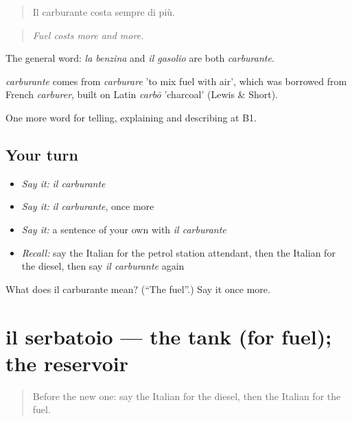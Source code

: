 \begin{quote}
Il carburante costa sempre di più.
\end{quote}

\begin{quote}
\emph{Fuel costs more and more.}
\end{quote}

The general word: \emph{la benzina} and \emph{il gasolio} are both \emph{carburante}.

\begin{cousinweb}
\emph{carburante} comes from \emph{carburare} 'to mix fuel with air', which was borrowed from French \emph{carburer}, built on Latin \emph{carbō} 'charcoal' (Lewis \& Short).
\end{cousinweb}

\begin{grammarlens}[title={What you've built}]
One more word for telling, explaining and describing at B1.
\end{grammarlens}

\subsection*{Your turn}
\begin{itemize}
\raggedright
  \item \emph{Say it:} \emph{il carburante}
  \item \emph{Say it:} \emph{il carburante}, once more
  \item \emph{Say it:} a sentence of your own with \emph{il carburante}
  \item \emph{Recall:} say the Italian for the petrol station attendant, then the Italian for the diesel, then say \emph{il carburante} again
\end{itemize}

\begin{tcolorbox}[breakable,colback=teal!4,colframe=teal!35!black,title={Before you move on}]
What does il carburante mean? (\textquotedblleft{}The fuel\textquotedblright{}.) Say it once more.
\end{tcolorbox}
\section[il serbatoio]{il serbatoio — the tank (for fuel); the reservoir}

\label{lesson:IT-C408-serbatoio}



\begin{quote}
Before the new one: say the Italian for the diesel, then the Italian for the fuel.
\end{quote}

